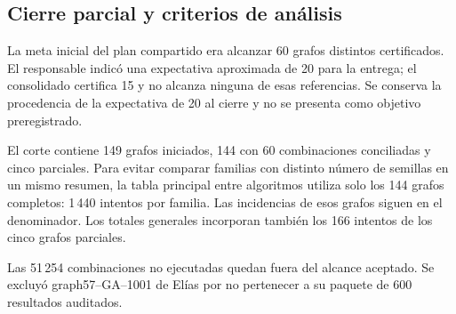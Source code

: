 \subsection{Cierre parcial y criterios de análisis}
La meta inicial del plan compartido era alcanzar 60 grafos distintos certificados. El responsable indicó una expectativa aproximada de 20 para la entrega; el consolidado certifica 15 y no alcanza ninguna de esas referencias. Se conserva la procedencia de la expectativa de 20 al cierre y no se presenta como objetivo preregistrado.

El corte contiene 149 grafos iniciados, 144 con 60 combinaciones conciliadas y cinco parciales. Para evitar comparar familias con distinto número de semillas en un mismo resumen, la tabla principal entre algoritmos utiliza solo los 144 grafos completos: 1\,440 intentos por familia. Las incidencias de esos grafos siguen en el denominador. Los totales generales incorporan también los 166 intentos de los cinco grafos parciales.

Las 51\,254 combinaciones no ejecutadas quedan fuera del alcance aceptado. Se excluyó graph57--GA--1001 de Elías por no pertenecer a su paquete de 600 resultados auditados.
